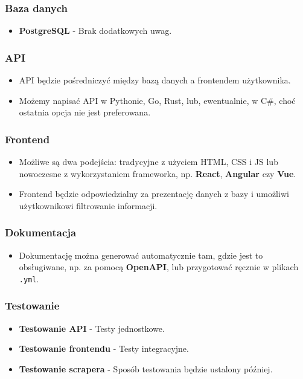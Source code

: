 \documentclass{article}
\begin{document}
\subsubsection{Baza danych}
\begin{itemize}
  \item \textbf{PostgreSQL} - Brak dodatkowych uwag.
\end{itemize}

\subsubsection{API}
\begin{itemize}
  \item API będzie pośredniczyć między bazą danych a frontendem użytkownika.
  \item Możemy napisać API w Pythonie, Go, Rust, lub, ewentualnie, w C\#, choć ostatnia opcja nie jest preferowana.
\end{itemize}

\subsubsection{Frontend}
\begin{itemize}
  \item Możliwe są dwa podejścia: tradycyjne z użyciem HTML, CSS i JS lub nowoczesne z wykorzystaniem frameworka, np. \textbf{React}, \textbf{Angular} czy \textbf{Vue}.
  \item Frontend będzie odpowiedzialny za prezentację danych z bazy i umożliwi użytkownikowi filtrowanie informacji.
\end{itemize}

\subsubsection{Dokumentacja}
\begin{itemize}
  \item Dokumentację można generować automatycznie tam, gdzie jest to obsługiwane, np. za pomocą \textbf{OpenAPI}, lub przygotować ręcznie w plikach \texttt{.yml}.
\end{itemize}

\subsubsection{Testowanie}
\begin{itemize}
  \item \textbf{Testowanie API} - Testy jednostkowe.
  \item \textbf{Testowanie frontendu} - Testy integracyjne.
  \item \textbf{Testowanie scrapera} - Sposób testowania będzie ustalony później.
\end{itemize}
\end{document}
